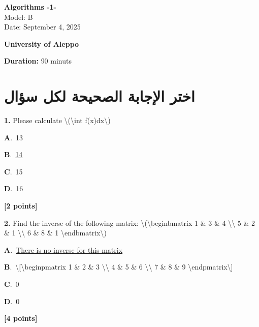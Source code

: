 \documentclass[12pt]{article}
\newcommand{\choice}[3]{%
  \noindent\textbf{#1}.~#2\hfill#3\par\vspace{0.25em}
}
\begin{document}
\begin{flushright}
{\Large \textbf{{\textenglish{Algorithms -1-}}}}\\[0.25em]
{\normalsize \textenglish{Model: }{\textenglish{B}}}\\[0.1em]
{\normalsize \textenglish{Date: }{\textenglish{September 4, 2025}}}
\end{flushright}

\vspace{0.6cm}

\noindent
\begin{minipage}[t]{0.65\textwidth}
  \raggedright
  \textbf{{\textenglish{University of Aleppo}}}\\[0.3em]
\end{minipage}\hfill
\begin{minipage}[t]{0.3\textwidth}
  \raggedleft
  \textenglish{\textbf{Duration: }}{\textenglish{90 minuts}}
\end{minipage}

\vspace{0.9cm}

\section*{اختر الإجابة الصحيحة لكل سؤال}

\noindent \textbf{\textenglish{1.}} {\textenglish{Please calculate \textbackslash{}(\textbackslash{}int f(x)dx\textbackslash{})}}

\noindent\choice{A}{{\textenglish{13}}}{}
\noindent\choice{B}{\underline{{\textenglish{14}}}}{}
\noindent\choice{C}{{\textenglish{15}}}{}
\noindent\choice{D}{{\textenglish{16}}}{}
\hfill \textbf{[2 points]}\vspace{0.5em}

\noindent \textbf{\textenglish{2.}} {\textenglish{Find the inverse of the following matrix: \textbackslash{}(\textbackslash{}begin{bmatrix} 1 \& 3 \& 4 \textbackslash{}\textbackslash{} 5 \& 2 \& 1 \textbackslash{}\textbackslash{} 6 \& 8 \& 1 \textbackslash{}end{bmatrix}\textbackslash{})}}

\noindent\choice{A}{\underline{{\textenglish{There is no inverse for this matrix}}}}{}
\noindent\choice{B}{{\textenglish{\textbackslash{}[\textbackslash{}begin{pmatrix} 1 \& 2 \& 3 \textbackslash{}\textbackslash{} 4 \& 5 \& 6 \textbackslash{}\textbackslash{} 7 \& 8 \& 9  \textbackslash{}end{pmatrix}\textbackslash{}]}}}{}
\noindent\choice{C}{{\textenglish{0}}}{}
\noindent\choice{D}{{\textenglish{0}}}{}
\hfill \textbf{[4 points]}\vspace{0.5em}
\end{document}
